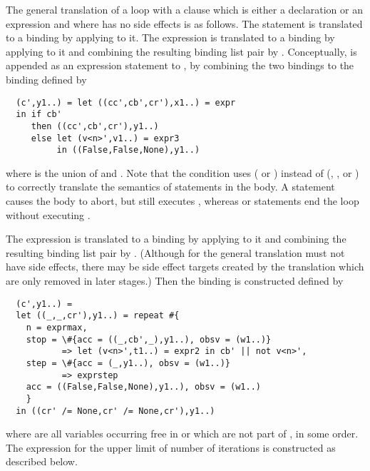 The general translation of a loop  with a clause  which is either a declaration or an expression
and where  has no side effects
is as follows. The statement  is translated to a binding  by applying  to it. The expression
 is translated to a binding  by applying  to it and combining the resulting binding
list pair by . Conceptually,  is appended as an expression statement to , by combining the two bindings
to the binding  defined by
\begin{verbatim}
  (c',y1..) = let ((cc',cb',cr'),x1..) = expr
  in if cb' 
     then ((cc',cb',cr'),y1..)
     else let (v<n>',v1..) = expr3
          in ((False,False,None),y1..)
\end{verbatim}
where  is the union of  and . Note that the condition uses  ( or ) 
instead of  (, , or ) to correctly translate the semantics of  
statements in the body. A  statement causes the body to abort, but still executes , whereas  
or  statements end the loop without executing .

The expression  is translated to a binding  by applying  to it and combining 
the resulting binding list pair by . (Although for the general translation  must not have side effects, there
may be side effect targets  created by the translation which are only removed in later stages.)
Then the binding  is constructed defined by
\begin{verbatim}
  (c',y1..) =
  let ((_,_,cr'),y1..) = repeat #{
    n = exprmax,
    stop = \#{acc = ((_,cb',_),y1..), obsv = (w1..)} 
           => let (v<n>',t1..) = expr2 in cb' || not v<n>',
    step = \#{acc = (_,y1..), obsv = (w1..)} 
           => exprstep
    acc = ((False,False,None),y1..), obsv = (w1..)
    }
  in ((cr' /= None,cr' /= None,cr'),y1..)
\end{verbatim}
where  are all variables occurring free in  or  which are not part of , in some order.
The expression  for the upper limit of number of iterations is constructed as described below.

